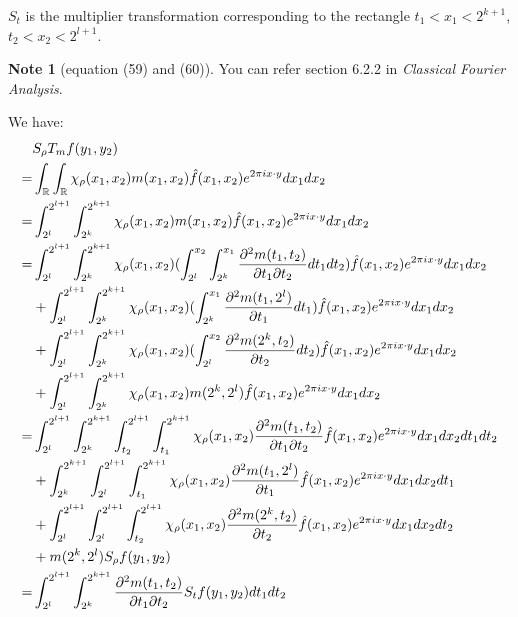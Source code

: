 \documentclass{report}
\theoremstyle{definition}
\newtheorem{note}{Note}
\theoremstyle{definition}
\theoremstyle{plain}
\numberwithin{theorem}{section}
\numberwithin{remark}{section}
\numberwithin{equation}{section}
\begin{document}
\begin{errata}[P111]
    $S_t$ is the multiplier transformation corresponding to the rectangle $t_1<x_1<2^{k+1}$, $t_2<x_2<2^{l+1}$.
\end{errata}
\begin{note}[equation (59) and (60)]
    You can refer section 6.2.2 in \emph{Classical Fourier Analysis}.\par
    We have:
    \begin{align*}
        &S_\rho T_mf(y_1,y_2)\\
        =&\int_{\mathbb{R}}\int_{\mathbb{R}}\chi_\rho(x_1,x_2)m(x_1,x_2)\Hat{f}(x_1,x_2)e^{2\pi i x\cdot y}dx_1dx_2\\
        =&\int_{2^l}^{2^{l+1}}\int_{2^k}^{2^{k+1}}\chi_\rho(x_1,x_2)m(x_1,x_2)\Hat{f}(x_1,x_2)e^{2\pi i x\cdot y}dx_1dx_2\\
        =&\int_{2^l}^{2^{l+1}}\int_{2^k}^{2^{k+1}}\chi_\rho(x_1,x_2)(\int_{2^l}^{x_2}\int_{2^k}^{x_1}\frac{\partial^2 m(t_1,t_2)}{\partial t_1\partial t_2}dt_1dt_2)\Hat{f}(x_1,x_2)e^{2\pi i x\cdot y}dx_1dx_2\\
        &+\int_{2^l}^{2^{l+1}}\int_{2^k}^{2^{k+1}}\chi_\rho(x_1,x_2)(\int_{2^k}^{x_1}\frac{\partial^2 m(t_1,2^l)}{\partial t_1}dt_1)\Hat{f}(x_1,x_2)e^{2\pi i x\cdot y}dx_1dx_2\\
        &+\int_{2^l}^{2^{l+1}}\int_{2^k}^{2^{k+1}}\chi_\rho(x_1,x_2)(\int_{2^l}^{x_2}\frac{\partial^2 m(2^k,t_2)}{\partial t_2}dt_2)\Hat{f}(x_1,x_2)e^{2\pi i x\cdot y}dx_1dx_2\\
        &+\int_{2^l}^{2^{l+1}}\int_{2^k}^{2^{k+1}}\chi_\rho(x_1,x_2)m(2^k,2^l)\Hat{f}(x_1,x_2)e^{2\pi i x\cdot y}dx_1dx_2\\
        =&\int_{2^l}^{2^{l+1}}\int_{2^k}^{2^{k+1}}\int_{t_2}^{2^{l+1}}\int_{t_1}^{2^{k+1}}\chi_\rho(x_1,x_2)\frac{\partial^2 m(t_1,t_2)}{\partial t_1\partial t_2}\Hat{f}(x_1,x_2)e^{2\pi i x\cdot y}dx_1dx_2dt_1dt_2\\
        &+\int_{2^k}^{2^{k+1}}\int_{2^l}^{2^{l+1}}\int_{t_1}^{2^{k+1}}\chi_\rho(x_1,x_2)\frac{\partial^2 m(t_1,2^l)}{\partial t_1}\Hat{f}(x_1,x_2)e^{2\pi i x\cdot y}dx_1dx_2dt_1\\
        &+\int_{2^l}^{2^{l+1}}\int_{2^l}^{2^{l+1}}\int_{t_2}^{2^{l+1}}\chi_\rho(x_1,x_2)\frac{\partial^2 m(2^k,t_2)}{\partial t_2}\Hat{f}(x_1,x_2)e^{2\pi i x\cdot y}dx_1dx_2dt_2\\
        &+m(2^k,2^l)S_\rho f(y_1,y_2)\\
        =&\int_{2^l}^{2^{l+1}}\int_{2^k}^{2^{k+1}}\frac{\partial^2 m(t_1,t_2)}{\partial t_1\partial t_2}S_tf(y_1,y_2)dt_1dt_2\\

\end{align*}
\end{note}
\end{document}
